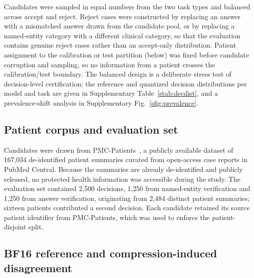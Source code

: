 \documentclass[pdflatex,sn-mathphys-num]{sn-jnl}%
\theoremstyle{thmstyleone}%
\theoremstyle{thmstyletwo}%
\theoremstyle{thmstylethree}%
\begin{document}
Candidates were sampled in equal numbers from the two task types and balanced across accept and
reject. Reject cases were constructed by replacing an answer with a mismatched answer drawn from
the candidate pool, or by replacing a named-entity category with a different clinical category, so
that the evaluation contains genuine reject cases rather than an accept-only distribution. Patient
assignment to the calibration or test partition (below) was fixed before candidate corruption and
sampling, so no information from a patient crosses the calibration/test boundary. The balanced
design is a deliberate stress test of decision-level certification; the reference and quantized
decision distributions per model and task are given in Supplementary Table~\ref{stab:decdist}, and a
prevalence-shift analysis in Supplementary Fig.~\ref{sfig:prevalence}.
 
\subsection*{Patient corpus and evaluation set}
 
Candidates were drawn from PMC-Patients~\cite{zhao2023large}, a publicly available dataset of
167{,}034 de-identified patient summaries curated from open-access case reports in PubMed Central.
Because the summaries are already de-identified and publicly released, no protected health information
was accessible during the study. The evaluation set contained 2{,}500 decisions, 1{,}250 from
named-entity verification and 1{,}250 from answer verification, originating from 2{,}484 distinct
patient summaries; sixteen patients contributed a second decision. Each candidate retained its source
patient identifier from PMC-Patients, which was used to enforce the patient-disjoint split.
 
\subsection*{BF16 reference and compression-induced disagreement}
 
\end{document}

